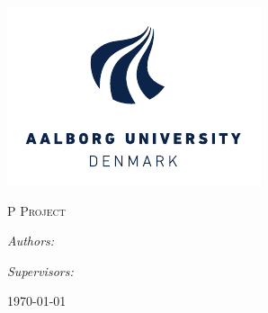 
\begin{titlepage}
  \centering

  \includegraphics[width=\textwidth]{fig/img/aau-logo.pdf}

  \textsc{\LARGE P\projectnumber{} Project}\\
  \textsc{\Large \projectdegree}

  \vspace{2cm}

  {\Huge\bfseries\projecttitle}

  \vspace{0.5cm}

  {\Large\bfseries\sffamily\projectsubtitle}

  \vspace{2cm}

  \begin{minipage}[t]{0.4\textwidth}
    \begin{flushleft}
      \large
      \emph{Authors:}\\
      \projectauthors
    \end{flushleft}
  \end{minipage}
  \begin{minipage}[t]{0.4\textwidth}
    \begin{flushright}
      \large
      \emph{Supervisors:}\\
      \projectsupervisors
    \end{flushright}
  \end{minipage}

  \vfill

  {\large\today}
\end{titlepage}
